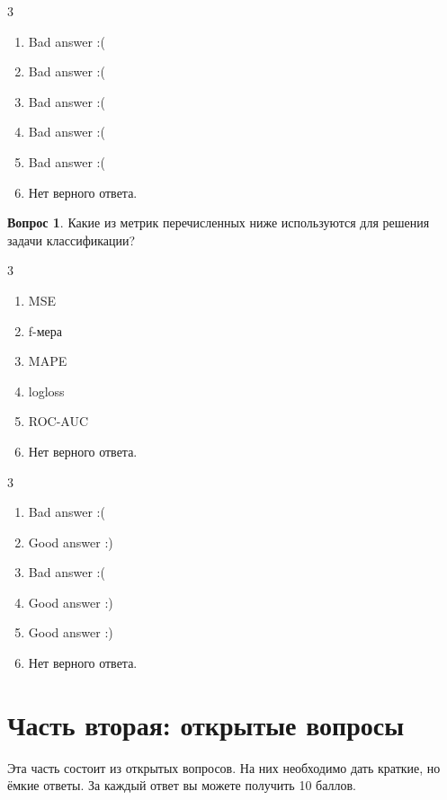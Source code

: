 \documentclass[12pt]{article}
\newenvironment{answerlist}[1][3]{
\begin{multicols}{#1}

\begin{enumerate}[label=\fbox{\emph{\Alph*}},ref=\emph{\alph*}]
}
{
\item Нет верного ответа.
\end{enumerate}
\end{multicols}
}
\theoremstyle{definition}
\newtheorem{question}{Вопрос}
\begin{document}
\begin{solution}
\begin{answerlist}
  \item Bad answer :(
  \item Bad answer :(
  \item Bad answer :(
  \item Bad answer :(
  \item Bad answer :(
\end{answerlist}
\end{solution}


\begin{question}
Какие из метрик перечисленных ниже используются для решения задачи классификации? 
\begin{answerlist}
   \item  MSE
   \item  f-мера
   \item  MAPE
   \item  logloss
   \item  ROC-AUC 
\end{answerlist}
\end{question}

\begin{solution}
\begin{answerlist}
  \item Bad answer :(
  \item Good answer :)
  \item Bad answer :(
  \item Good answer :)
  \item Good answer :)
\end{answerlist}
\end{solution}




\newpage 

 
\section*{Часть вторая: открытые вопросы}

Эта часть состоит из открытых вопросов. На них необходимо дать краткие, но ёмкие ответы. За каждый ответ вы можете получить 10 баллов.
\end{document}
